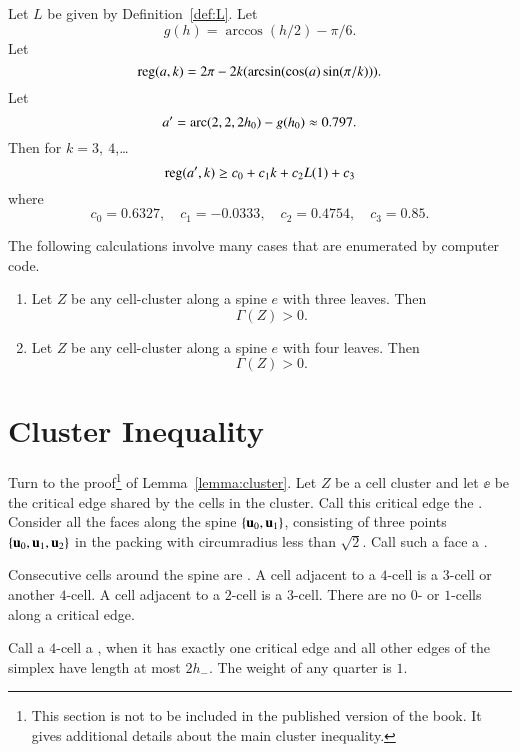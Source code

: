 \begin{calculation}\label{calc:cc:alin2}
Let $L$ be given by Definition~\ref{def:L}.
Let
\[ 
g(h) = \arccos(h/2) - \pi/6.
\] 
Let
\[ 
{\operatorname{reg}}(a,k) = 2\pi - 2 k (\arcsin(\cos(a)\sin(\pi/k))).
\] 
Let
\[ a'=\operatorname{arc}(2,2,2{h_0})-g({h_0}) \approx
0.797.\]  Then for $k=3,~4$,\dots
\[ {\operatorname{reg}}(a',k) \ge c_0 + c_1 k + c_2 L(1) +
c_3\] 
where 
\[ c_0 = 0.6327,\quad c_1 = -0.0333,\quad c_2 =
0.4754,\quad c_3 = 0.85.\] 
\end{calculation}

\begin{calculation}\label{calc:shorts}
The following calculations involve many cases that are enumerated by
computer code.
\begin{enumerate}\wasitemize 
\item {} Let $Z$ be any cell-cluster along a spine $e$
with three leaves.  Then
\[ 
\Gamma(Z)> 0.
\] 
\item {} Let $Z$ be any cell-cluster along a spine $e$
with four leaves.  Then
\[ 
\Gamma(Z)> 0.
\] 
\end{enumerate}\wasitemize 
\end{calculation}



\chapter{Cluster Inequality}

Turn to the proof\footnote{This section is not to be included
in the published version of the book.  It gives additional details about the
main cluster inequality.} of Lemma~\ref{lemma:cluster}.  Let $Z$ be a cell
cluster and let $\ee$ be the critical edge shared by the cells in the
cluster.  Call this critical edge the .  Consider all
the faces along the spine $\{ {\mathbf u}_0, {\mathbf u}_1\}$, consisting of three
points $\{ {\mathbf u}_0, {\mathbf u}_1, {\mathbf u}_2\}$ in the packing with circumradius less
than $\sqrt2$.  Call such a face a . 
%
%
%

Consecutive cells around the spine are .  A cell
adjacent to a $4$-cell is a $3$-cell or another $4$-cell.  A cell
adjacent to a $2$-cell is a $3$-cell.  There are no $0$- or $1$-cells
along a critical edge.  %
%

Call a $4$-cell a , when it has exactly one critical
edge and all other edges of the simplex have length at most $2 h_-$.
The weight of any quarter is $1$.


